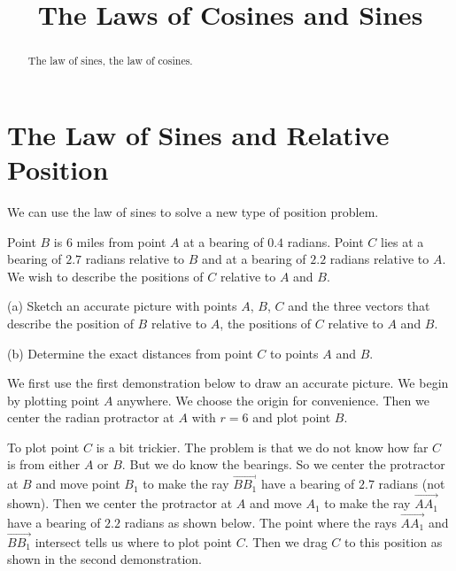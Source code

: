 \documentclass{ximera}
\title{The Laws of Cosines and Sines}
\begin{document}
\begin{abstract}
The law of sines, the law of cosines.
\end{abstract}
\maketitle


\section{The Law of Sines and Relative Position}
We can use the law of sines to solve a new type of position problem.

\begin{example}  \label{Exer748gtgb}
Point $B$ is $6$ miles from point $A$ at a bearing of $0.4$ radians. Point $C$ lies at a bearing of $2.7$ radians relative to $B$ and at a bearing of $2.2$ radians relative to $A$. We wish to describe the positions of $C$ relative to $A$ and $B$.


(a) Sketch an accurate picture with points $A$, $B$, $C$ and the three vectors that describe the position of $B$ relative to $A$, the positions of $C$ relative to $A$ and $B$.

(b) Determine the exact distances from point $C$ to points $A$ and $B$.

\begin{explanation}
We first use the first demonstration below to draw an accurate picture. We begin by plotting point $A$ anywhere. We choose the origin for convenience. Then we center the radian protractor at $A$ with $r=6$ and plot point $B$.

To plot point $C$ is a bit trickier. The problem is that we do not know how far $C$ is from either $A$ or $B$. But we do know the bearings. So we center the protractor at $B$ and move point $B_1$ to make the ray $\overrightarrow{BB_1}$ have a bearing of $2.7$ radians (not shown). Then we center the protractor at $A$ and move $A_1$ to make the ray $\overrightarrow{AA_1}$ have a bearing of $2.2$ radians as shown below. The point where the rays $\overrightarrow{AA_1}$ and $\overrightarrow{BB_1}$ intersect tells us where to plot point $C$.  Then we drag $C$ to this position as shown in the second demonstration.

 
\begin{onlineOnly}
    \begin{center}
\end{center}
\end{onlineOnly}


\end{explanation}
\end{example}
\end{document}
